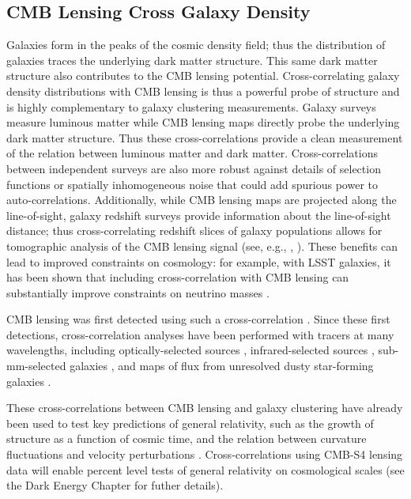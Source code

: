\subsection{CMB Lensing Cross Galaxy Density}
Galaxies form in the peaks of the cosmic density field; thus the distribution of galaxies traces the underlying dark matter structure.  This same dark matter structure also contributes to the CMB lensing potential.
Cross-correlating galaxy density distributions with CMB lensing is thus a powerful probe of structure and is highly complementary to galaxy clustering measurements.
Galaxy surveys measure luminous matter while CMB lensing maps directly probe the underlying dark matter structure. Thus these cross-correlations provide a clean measurement of the relation between luminous matter and dark matter.
Cross-correlations between independent surveys are also more robust against details of selection functions or spatially inhomogeneous noise that could add spurious power to auto-correlations.
Additionally, while CMB lensing maps are projected along the line-of-sight, galaxy redshift surveys provide information about the line-of-sight distance; thus cross-correlating redshift slices of galaxy populations allows for tomographic analysis of the CMB lensing signal (see, e.g., \cite{Baxter:2016ziy}, \cite{Miyatake:2016gdc}).
These benefits can lead to improved constraints on cosmology: for example, with LSST galaxies, it has been shown that including cross-correlation with CMB lensing can substantially improve constraints on neutrino masses \cite{Pearson:2013iha}.


CMB lensing was first detected using such a cross-correlation \cite{Smith:2007rg, Hirata:2008cb}.  Since these first detections, cross-correlation analyses have been performed with tracers at many wavelengths, including optically-selected sources \cite{Bleem:2012gm, Sherwin:2012mr, Ade:2013tyw, Baxter:2016ziy, Pullen:2015vtb}, infrared-selected sources \cite{Bleem:2012gm, Geach:2013zwa, DiPompeo:2014yea}, sub-mm-selected galaxies \cite{Bianchini:2014dla}, and maps of flux from unresolved dusty star-forming galaxies \cite{Holder:2013hqu, Hanson:2013daa, Ade:2013aro, vanEngelen:2014zlh}. 

These cross-correlations between CMB lensing and galaxy clustering have already been used to test key predictions of general relativity, such as the growth of structure \cite{Baxter:2016ziy} as a function of cosmic time, and the relation between curvature fluctuations and velocity perturbations \cite{Pullen:2015vtb}. Cross-correlations using CMB-S4 lensing data will enable percent level tests of general relativity on cosmological scales (see the Dark Energy Chapter for futher details).

